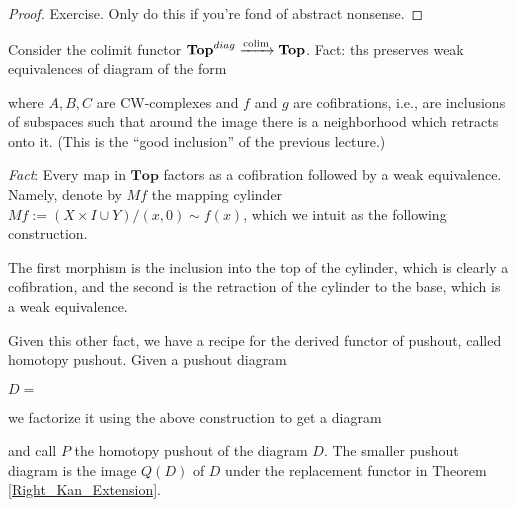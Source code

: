 \documentclass[../MH_Total.tex]{subfiles}
\begin{document}
\begin{proof}
	Exercise. Only do this if you're fond of abstract nonsense.
\end{proof}

\begin{example}
	Consider the colimit functor $\mathbf{Top}^{diag} \xrightarrow{\operatorname{colim}}\mathbf{Top}$. Fact: ths preserves weak equivalences of diagram of the form
	\begin{center}
	\end{center}
	where $A,B,C$ are CW-complexes and $f$ and $g$ are cofibrations, i.e., are inclusions of subspaces such that around the image there is a neighborhood which retracts onto it. (This is the ``good inclusion'' of the previous lecture.)
\end{example}

\emph{Fact}: Every map in $\mathbf{Top}$ factors as a cofibration followed by a weak equivalence. Namely, denote by $Mf$ the mapping cylinder $Mf := (X \times I \cup Y)/(x,0) \sim f(x)$, which we intuit as the following construction.

\begin{figure}[h]
\end{figure}
The first morphism is the inclusion into the top of the cylinder, which is clearly a cofibration, and the second is the retraction of the cylinder to the base, which is a weak equivalence.

Given this other fact, we have a recipe for the derived functor of pushout, called homotopy pushout. Given a pushout diagram
\begin{center}
$D=$
\end{center}
we factorize it using the above construction to get a diagram
\begin{center}
\end{center}
and call $P$ the homotopy pushout of the diagram $D$. The smaller pushout diagram is the image $Q(D)$ of $D$ under the replacement functor in Theorem \ref{Right_Kan_Extension}. 
\end{document}
